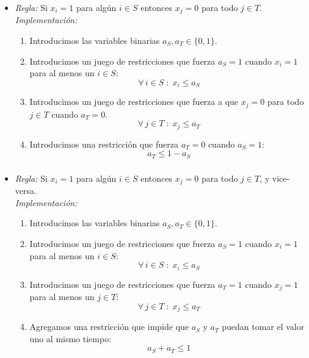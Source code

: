 \documentclass[ 10pt, xcolor = dvipsnames]{beamer}
\begin{document}
\begin{frame}[allowframebreaks]
\frametitle{\insertsection}

\begin{itemize}
\item \emph{Regla:} Si $x_i = 1$ para alg\'un $i \in S$ entonces $x_j = 0$ para todo $j \in T$. \\[1ex] \emph{Implementaci\'on:}
\begin{enumerate}
\item Introducimos las variables binarias $a_S, a_T \in \{ 0, 1 \}$. 
\item Introducimos un juego de restricciones que fuerza $a_S = 1$ cuando $x_i = 1$ \linebreak para al menos un $i \in S$: 
\[
\forall \, i \in S \; \colon \; x_i \leq a_S
\]
\item Introducimos un juego de restricciones que fuerza a que $x_j = 0$ para todo $j \in T$ cuando $a_T = 0$. 
\[
\forall \, j \in T \; \colon \; x_j \leq a_T
\]
\item Introducimos una restricci\'on que fuerza $a_T = 0$ cuando $a_S = 1$: 
\[
a_T \leq 1 - a_S
\]
\end{enumerate}
\end{itemize}

\end{frame}

\begin{frame}[allowframebreaks]
\frametitle{\insertsection}

\begin{itemize}
\item \emph{Regla:} Si $x_i = 1$ para alg\'un $i \in S$ entonces $x_j = 0$ para todo $j \in T$, y vice-versa. \\[1ex] \emph{Implementaci\'on:}
\begin{enumerate}
\item Introducimos las variables binarias $a_S, a_T \in \{ 0, 1 \}$. 
\item Introducimos un juego de restricciones que fuerza $a_S = 1$ cuando $x_i = 1$ \linebreak para al menos un $i \in S$: 
\[
\forall \, i \in S \; \colon \; x_i \leq a_S
\]
\item Introducimos un juego de restricciones que fuerza $a_T = 1$ cuando $x_j = 1$ \linebreak para al menos un $j \in T$: 
\[
\forall \, j \in T \; \colon \; x_j \leq a_T
\]
\item Agregamos una restricci\'on que impide que $a_S$ y $a_T$ puedan tomar el valor uno al mismo tiempo: 
\[
a_S + a_T \leq 1
\]
\end{enumerate}
\end{itemize}

\end{frame}
\end{document}
